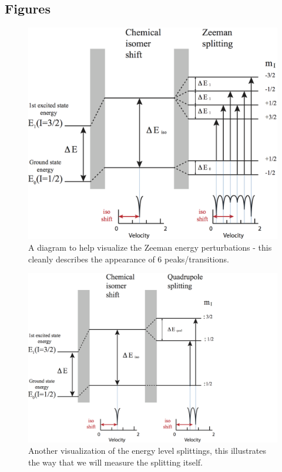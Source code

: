 \documentclass[reprint, nobibnotes, amssymb, amsmath, amsfonts, mathtools, mathrsfs, floatfix]{revtex4-1}
\begin{document}
      \FloatBarrier

    \subsection{Figures}
    \begin{widetext}
      \FloatBarrier

      \begin{figure}[h]
        \centering
        \includegraphics[width=\linewidth]{Mossb_energy_shifts_zeeman.png}
        \caption{A diagram to help visualize the Zeeman energy perturbations - this cleanly describes the appearance of 6 peaks/transitions.~\cite{lab_manual}~\label{zeeman_shifts}}
      \end{figure}

      \begin{figure}[h]
        \centering
        \includegraphics[width=\linewidth]{Mossb_quad_shifts.png}
        \caption{Another visualization of the energy level splittings, this illustrates the way that we will measure the splitting itself.~\cite{lab_manual}~\label{quadrupole_shifts}}
      \end{figure}


\end{widetext}
\end{document}
